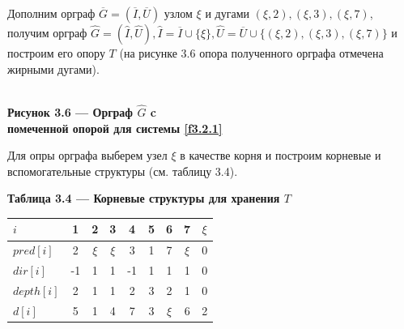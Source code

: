 \documentclass[14pt]{extarticle}%
\begin{document}
Дополним орграф $\overline{G}=(\overline{I},\overline{U})$ узлом $\xi$ и дугами $(\xi,2), (\xi,3), (\xi,7)$, получим орграф $\widehat{G}=(\widehat{I}, \widehat{U}), \widehat{I}=\overline{I}\cup \{\xi\}, \widehat{U}=\overline{U}\cup \{(\xi,2), (\xi,3), (\xi,7)\}$ и построим его опору $T$ (на рисунке 3.6 опора полученного орграфа отмечена жирными дугами).

\begin{center}
\\
\textbf{Рисунок 3.6 --- Орграф $\widehat{G}$ c\\помеченной опорой для системы \eqref{f3.2.1}}
\end{center}

Для опры орграфа выберем узел $\xi$ в качестве корня и построим корневые и вспомогательные структуры (см. таблицу 3.4).

\begin{center}
\textbf{Таблица 3.4 --- Корневые структуры для хранения $T$}\\
\begin{tabular}{l|cccccccc}
  $i$&1&2&3&4&5&6&7&$\xi$\\\hline
 $pred[i]$&2 & $\xi$ & $\xi$ & 3 & 1 & 7 & $\xi$ & 0 \\
 $dir[i]$& -1 & 1 & 1 & -1 & 1 & 1 & 1 & 0 \\
 $depth[i]$&2 & 1 & 1 & 2 & 3 & 2 & 1 & 0 \\
 $d[i]$&5 & 1 & 4 & 7 & 3 & $\xi$ & 6 & 2 \\
\end{tabular}
\end{center}
\end{document}

